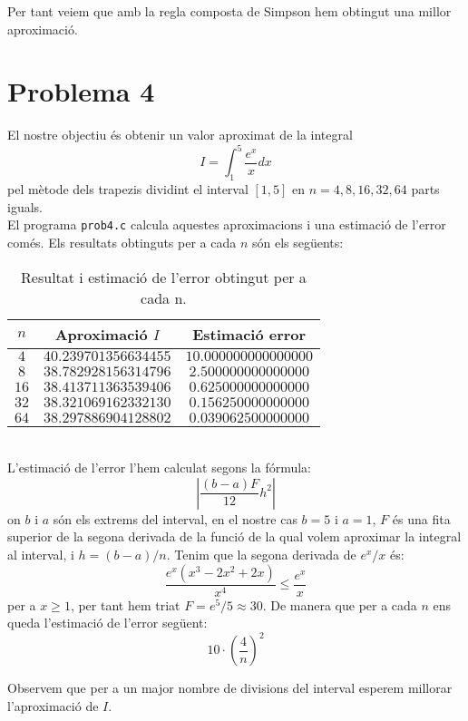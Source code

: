 \documentclass[12pt]{article}
\begin{document}
	Per tant veiem que amb la regla composta de Simpson hem obtingut una millor aproximació.
	\newpage
	\section*{Problema 4}
	El nostre objectiu és obtenir un valor aproximat de la integral
	\begin{equation*}
	I=\int^{5}_1\dfrac{e^x}{x}dx
	\end{equation*}
	pel mètode dels trapezis dividint el interval $[1,5]$ en $n=4, 8, 16, 32, 64$ parts iguals.\\
	
	El programa \texttt{prob4.c} calcula aquestes aproximacions i una estimació de l'error comés. Els resultats obtinguts per a cada $n$ són els següents:
	\begin{table}[h!]
		\centering
		\caption{Resultat i estimació de l'error obtingut per a cada n.}	
		\begin{tabular}{c|c|c}
			$n$ & Aproximació $I$ &Estimació error\\
			\hline
			\hline
			$4$ & $40.239701356634455$  &$10.000000000000000$\\
			$8$ & $38.782928156314796$ &$2.500000000000000$\\
			$16$ & $38.413711363539406$ &$0.625000000000000$\\
			$32$ & $38.321069162332130$ &$0.156250000000000$\\
			$64$ & $38.297886904128802$ &$0.039062500000000$\\
		\end{tabular}
	\end{table}\\
	L'estimació de l'error l'hem calculat segons la fórmula:
	$$\left| \dfrac{(b-a)F}{12}h^2 \right| $$
	on $b$ i $a$ són els extrems del interval, en el nostre cas $b=5$ i $a=1$, $F$ és una fita superior de la segona derivada de la funció de la qual volem aproximar la integral al interval, i $h=(b-a)/n$. Tenim que la segona derivada de $e^x/x$ és:
	$$\dfrac{e^x(x^3-2x^2+2x)}{x^4}\leq\dfrac{e^x}{x}$$
	per a $x\geq 1$, per tant hem triat $F=e^5/5\approx30$. De manera que per a cada $n$ ens queda l'estimació de l'error següent:
	$$10\cdot\left( \frac{4}{n}\right)^2 $$
	
	Observem que per a un major nombre de divisions del interval esperem millorar l'aproximació de $I$.
\end{document}
